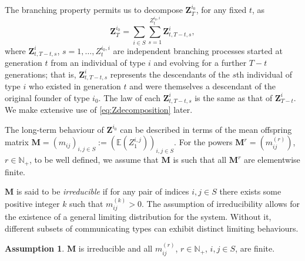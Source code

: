 \documentclass[preprint,3p,12pt]{elsarticle}
\theoremstyle{definition}
\newtheorem{assumption}{Assumption}
\begin{document}
The branching property permits us to decompose $\boldsymbol{Z}^{i_0}_T$, for any fixed $t$, as
\begin{equation}\label{eq:Zdecomposition}
\boldsymbol{Z}^{i_0}_T = \sum_{i\in S}\sum_{s=1}^{Z_t^{i_0, i}} \boldsymbol{Z}^i_{t,T-t,s},
\end{equation}
where $\boldsymbol{Z}_{t, T-t, s}^i$, $s=1,\dots,Z_t^{i_0,i}$ are independent branching processes started at generation $t$ from an individual of type $i$ and evolving for a further $T-t$ generations; that is, $\boldsymbol{Z}_{t, T-t, s}^i$ represents the descendants of the $s$th individual of type $i$ who existed in generation $t$ and were themselves a descendant of the original founder of type $i_0$. The law of each $\boldsymbol{Z}_{t, T-t, s}^i$ is the same as that of $\boldsymbol{Z}^i_{T-t}$. We make extensive use of \eqref{eq:Zdecomposition} later.

The long-term behaviour of $\boldsymbol{Z}^{i_0}$ can be described in terms of the mean offspring matrix $\boldsymbol{M}=(m_{ij})_{i,j \in S}:=(\mathbb{E}(Z_1^{i, j}))_{i,j \in S}$. For the powers $\boldsymbol{M}^r=(m_{ij}^{(r)})$, $r \in \mathbb{N}_+$, to be well defined, we assume that $\boldsymbol{M}$ is such that all $\boldsymbol{M}^r$ are elementwise finite.

$\boldsymbol{M}$ is said to be \emph{irreducible} if for any pair of indices $i,j \in S$ there exists some positive integer $k$ such that $m_{ij}^{(k)} > 0$. The assumption of irreducibility allows for the existence of a general limiting distribution for the system. Without it, different subsets of communicating types can exhibit distinct limiting behaviours.

\begin{assumption}\label{infinite_matrix}
    $\boldsymbol{M}$ is irreducible and all $m_{ij}^{(r)}$, $r \in \mathbb{N}_+$, $i,j \in S$, are finite.
\end{assumption}
\end{document}
